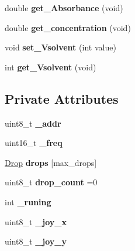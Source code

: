 \begin{DoxyCompactItemize}
\item 
\mbox{\label{class_open_drop_a7bd9fc2d295a8f79b599f8012e869f22}} 
double {\bfseries get\+\_\+\+Absorbance} (void)
\item 
\mbox{\label{class_open_drop_ae514f01936ac24be76d96aecd26244e6}} 
double {\bfseries get\+\_\+concentration} (void)
\item 
\mbox{\label{class_open_drop_a39861b6101ce5ecc52636a29da2100b2}} 
void {\bfseries set\+\_\+\+Vsolvent} (int value)
\item 
\mbox{\label{class_open_drop_a247e8bced9d487ac7a0b33dc94192d1a}} 
int {\bfseries get\+\_\+\+Vsolvent} (void)
\end{DoxyCompactItemize}
\subsection*{Private Attributes}
\begin{DoxyCompactItemize}
\item 
\mbox{\label{class_open_drop_a1bfed56abe74c90a3ddaa97191239add}} 
uint8\+\_\+t {\bfseries \+\_\+addr}
\item 
\mbox{\label{class_open_drop_ae83e4ff0a3dbc88d48f4e3663aa877b3}} 
uint16\+\_\+t {\bfseries \+\_\+freq}
\item 
\mbox{\label{class_open_drop_afbba6fac2d2e521ec46d4046831424a4}} 
\mbox{\hyperlink{class_drop}{Drop}} {\bfseries drops} \mbox{[}max\+\_\+drops\mbox{]}
\item 
\mbox{\label{class_open_drop_a8ec8b5cfebfe67dd27fa9d1266dffcbe}} 
uint8\+\_\+t {\bfseries drop\+\_\+count} =0
\item 
\mbox{\label{class_open_drop_aaa998879ae3a73163bce630b95a8eed7}} 
int {\bfseries \+\_\+runing}
\item 
\mbox{\label{class_open_drop_ac6670ad856ca681f67627c959ab4b1b5}} 
uint8\+\_\+t {\bfseries \+\_\+joy\+\_\+x}
\item 
\mbox{\label{class_open_drop_a3e37a31f0b88d37a01004ba27918f3a1}} 
uint8\+\_\+t {\bfseries \+\_\+joy\+\_\+y}
\end{DoxyCompactItemize}
